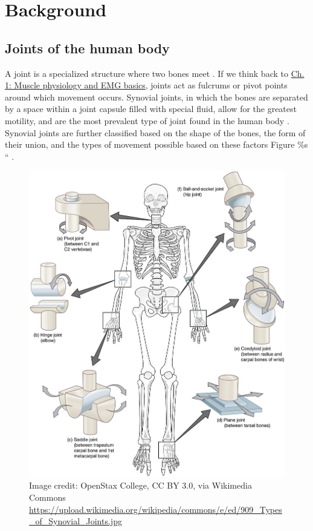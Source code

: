 \documentclass{article}
\begin{document}
\section{Background}

\subsection{Joints of the human body}

A joint is a specialized structure where two bones meet \citep{levangie2011joint}. If we think back to \href{https://curvenote.com/oxa:EPpXta8zJdzN048lz8AR/hZTnTYzQR5EQmCKX51Wj}{Ch. 1: Muscle physiology and EMG basics}, joints act as fulcrums or pivot points around which movement occurs. Synovial joints, in which the bones are separated by a space within a joint capsule filled with special fluid, allow for the greatest motility, and are the most prevalent type of joint found in the human body \citep{openStax_joints}. Synovial joints are further classified based on the shape of the bones, the form of their union, and the types of movement possible based on these factors \citep{}Figure \%s `` .

\begin{figure}[!htbp]
\centering
\includegraphics[width=0.6\linewidth]{files/EPpXta8zJdzN048lz8AR-c7ef96476cd11e6b82f19c58572535f8.png}
\caption[]{Image credit: OpenStax College, CC BY 3.0, via Wikimedia Commons \href{https://upload.wikimedia.org/wikipedia/commons/e/ed/909\_Types\_of\_Synovial\_Joints.jpg}{https://upload.wikimedia.org/wikipedia/commons/e/ed/909\_Types\_of\_Synovial\_Joints.jpg}}
\label{QClq2ogUPX}
\end{figure}
\end{document}
